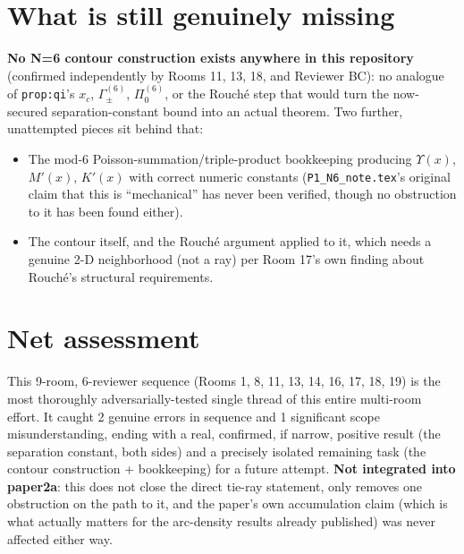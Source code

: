 \documentclass[11pt]{article}
\begin{document}
\section*{What is still genuinely missing}
\textbf{No N=6 contour construction exists anywhere in this repository} (confirmed independently
by Rooms 11, 13, 18, and Reviewer BC): no analogue of \texttt{prop:qi}'s $x_c$, $\Gamma_\pm^{(6)}$,
$\Pi_0^{(6)}$, or the Rouch\'e step that would turn the now-secured separation-constant bound into
an actual theorem. Two further, unattempted pieces sit behind that:
\begin{itemize}
\item The mod-6 Poisson-summation/triple-product bookkeeping producing $\Upsilon(x)$, $M'(x)$,
$K'(x)$ with correct numeric constants (\texttt{P1\_N6\_note.tex}'s original claim that this is
``mechanical'' has never been verified, though no obstruction to it has been found either).
\item The contour itself, and the Rouch\'e argument applied to it, which needs a genuine 2-D
neighborhood (not a ray) per Room 17's own finding about Rouch\'e's structural requirements.
\end{itemize}

\section*{Net assessment}
This 9-room, 6-reviewer sequence (Rooms 1, 8, 11, 13, 14, 16, 17, 18, 19) is the most thoroughly
adversarially-tested single thread of this entire multi-room effort. It caught 2 genuine errors in
sequence and 1 significant scope misunderstanding, ending with a real, confirmed, if narrow,
positive result (the separation constant, both sides) and a precisely isolated remaining task (the
contour construction + bookkeeping) for a future attempt. \textbf{Not integrated into paper2a}:
this does not close the direct tie-ray statement, only removes one obstruction on the path to it,
and the paper's own accumulation claim (which is what actually matters for the arc-density results
already published) was never affected either way.
\end{document}
